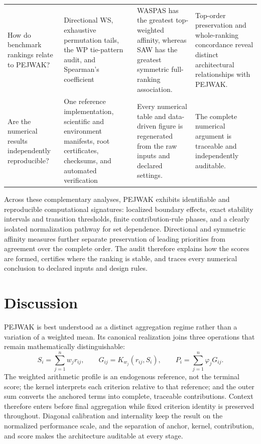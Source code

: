 \documentclass[reqno,11pt]{amsart}
\theoremstyle{definition}
\theoremstyle{plain}
\theoremstyle{remark}
\begin{document}
\begin{table}[htbp]
\begin{tabularx}{\textwidth}{p{}XXX}
\addlinespace[2pt]
How do benchmark rankings relate to PEJWAK?
&
Directional WS, exhaustive permutation tails, the WP tie-pattern audit,
and Spearman's coefficient
&
WASPAS has the greatest top-weighted affinity, whereas SAW has the
greatest symmetric full-ranking association.
&
Top-order preservation and whole-ranking concordance reveal distinct
architectural relationships with PEJWAK.
\\

\addlinespace[2pt]
Are the numerical results independently reproducible?
&
One reference implementation, scientific and environment manifests,
root certificates, checksums, and automated verification
&
Every numerical table and data-driven figure is regenerated from the raw
inputs and declared settings.
&
The complete numerical argument is traceable and independently
auditable.
\\

\bottomrule
\end{tabularx}
\end{table}

Across these complementary analyses, PEJWAK exhibits identifiable and
reproducible computational signatures: localized boundary effects, exact
stability intervals and transition thresholds, finite contribution-rule
phases, and a clearly isolated normalization pathway for set dependence.
Directional and symmetric affinity measures further separate preservation
of leading priorities from agreement over the complete order. The audit
therefore explains how the scores are formed, certifies where the ranking
is stable, and traces every numerical conclusion to declared inputs and
design rules.

\section{Discussion}
\label{sec:discussion}

PEJWAK is best understood as a distinct aggregation regime rather than a
variation of a weighted mean. Its canonical realization joins three
operations that remain mathematically distinguishable:
\[
S_i=\sum_{j=1}^{n}w_jr_{ij},
\qquad
G_{ij}=K_{w_j}(r_{ij},S_i),
\qquad
P_i=\sum_{j=1}^{n}\varphi_jG_{ij}.
\]
The weighted arithmetic profile is an endogenous reference, not the
terminal score; the kernel interprets each criterion relative to that
reference; and the outer sum converts the anchored terms into complete,
traceable contributions. Context therefore enters before final
aggregation while fixed criterion identity is preserved throughout.
Diagonal calibration and internality keep the result on the normalized
performance scale, and the separation of anchor, kernel, contribution,
and score makes the architecture auditable at every stage.
\end{document}
